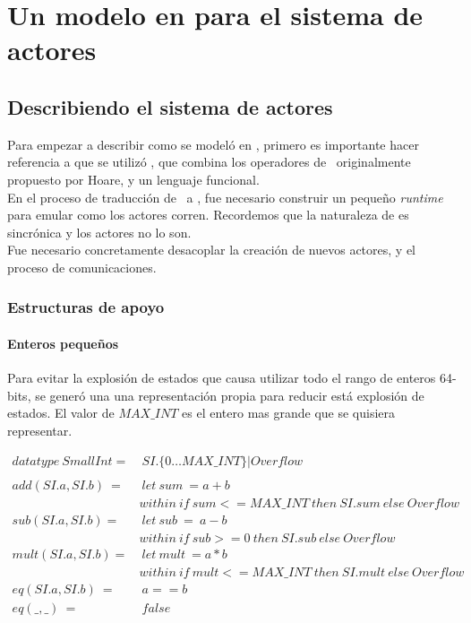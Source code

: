 \chapter{Un modelo en para el sistema de actores}

\section{Describiendo el sistema de actores} 
Para empezar a describir como se modeló en \CSP, primero es importante hacer
referencia a que se utilizó \CSPm \cite{fdr}, que combina los operadores de \CSP\ 
originalmente propuesto por Hoare\cite{Hoare:1978:CSP:359576.359585}, y un lenguaje funcional. \\
En el proceso de traducción de \SAL\ a \CSPm, fue necesario construir un pequeño
\textit{runtime} para emular como los actores corren. Recordemos que la
naturaleza de \CSP es sincrónica y los actores no lo son. \\
Fue necesario concretamente desacoplar la creación de nuevos actores, y el proceso de comunicaciones. 

\subsection{Estructuras de apoyo}

\subsubsection{Enteros pequeños}

Para evitar la explosión de estados que causa utilizar todo el rango de enteros 64-bits, se generó una
una representación propia para reducir está explosión de estados. El valor de $MAX\_INT$ es el entero mas grande que se quisiera representar.

\begin{align*}
datatype\ SmallInt =&\ SI.\{0 \ldots MAX\_INT\} | Overflow \\
\\
add(SI.a, SI.b)\ =&\ let\ sum\ = a + b \\
&within\ if\ sum <= MAX\_INT\ then\ SI.sum\ else\ Overflow  \\
%
sub(SI.a, SI.b) =&\ let\ sub\ =\ a - b \\
& within\ if\ sub >= 0\ then\ SI.sub\ else\ Overflow \\
%
mult(SI.a, SI.b) =&\ let\ mult\ = a * b \\
& within\ if\ mult <= MAX\_INT\ then\ SI.mult\ else\ Overflow \\
eq(SI.a, SI.b)\ =&\ a == b \\
eq(\_, \_)\ =&\ false
\end{align*}

